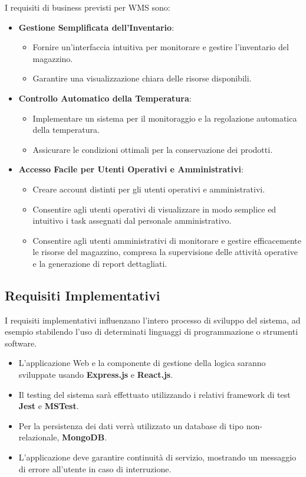 I requisiti di business previsti per WMS sono:
\begin{itemize}
    \item \textbf{Gestione Semplificata dell'Inventario}:
    \begin{itemize}
        \item Fornire un'interfaccia intuitiva per monitorare e gestire l'inventario del magazzino.
        \item Garantire una visualizzazione chiara delle risorse disponibili.
    \end{itemize}
    \item \textbf{Controllo Automatico della Temperatura}:
    \begin{itemize}
        \item Implementare un sistema per il monitoraggio e la regolazione automatica della temperatura.
        \item Assicurare le condizioni ottimali per la conservazione dei prodotti.
    \end{itemize}
    \item \textbf{Accesso Facile per Utenti Operativi e Amministrativi}:
    \begin{itemize}
        \item Creare account distinti per gli utenti operativi e amministrativi.
        \item Consentire agli utenti operativi di visualizzare in modo semplice ed intuitivo i task assegnati dal personale amministrativo.
        \item Consentire agli utenti amministrativi di monitorare e gestire efficacemente le risorse del magazzino, compresa la supervisione delle attività operative e la generazione di report dettagliati.
    \end{itemize}
\end{itemize}

\subsection{Requisiti Implementativi}

I requisiti implementativi influenzano l'intero processo di sviluppo del
sistema, ad esempio stabilendo l'uso di determinati linguaggi di programmazione o strumenti software.

\begin{itemize}
    \item L'applicazione Web e la componente di gestione della logica saranno sviluppate usando \textbf{Express.js} e \textbf{React.js}.
    \item Il testing del sistema sarà effettuato utilizzando i relativi framework di test \textbf{Jest} e \textbf{MSTest}.
    \item Per la persistenza dei dati verrà utilizzato un database di tipo non-relazionale, \textbf{MongoDB}.
    \item L'applicazione deve garantire continuità di servizio, mostrando un messaggio di errore all'utente in caso di interruzione.
\end{itemize}



